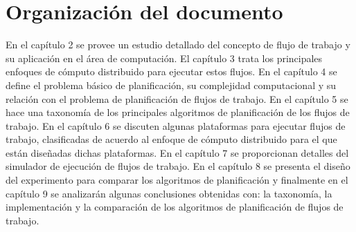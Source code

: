\section{Organización del documento}
En el capítulo 2 se provee un estudio detallado del concepto de flujo de trabajo y su aplicación en el área de computación. El capítulo 3 trata los principales enfoques de cómputo distribuido para ejecutar estos flujos. En el capítulo 4 se define el problema básico de planificación, su complejidad computacional y su relación con el problema de planificación de flujos de trabajo. En el capítulo 5 se hace una taxonomía de los principales algoritmos de planificación de los flujos de trabajo. En el capítulo 6 se discuten	algunas plataformas para ejecutar flujos de trabajo, clasificadas de acuerdo al enfoque de cómputo distribuido para el que están diseñadas dichas plataformas. En el capítulo 7 se proporcionan detalles del simulador de ejecución de flujos de trabajo. En el capítulo 8 se presenta el diseño del experimento para comparar los algoritmos de planificación y finalmente en el capítulo 9 se analizarán algunas conclusiones obtenidas con: la taxonomía, la implementación y la comparación de los algoritmos de planificación de flujos de trabajo.
